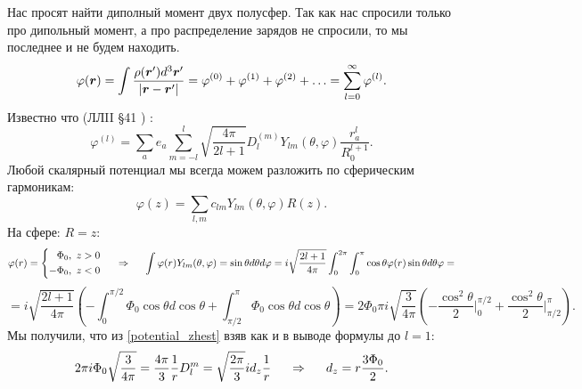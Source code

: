 

Нас просят найти диполный момент двух полусфер.
Так как нас спросили только про дипольный момент, а про распределение зарядов не спросили, то мы последнее и не будем находить.
\begin{equation*}
    \varphi(\mbox{\boldmath $r$}) = \int \frac{\rho(\mbox{\boldmath $r$}') d^3 \mbox{\boldmath $r$}'}{|\mbox{\boldmath $r$} - \mbox{\boldmath $r$}'|}
     = \varphi^{(0)} + \varphi^{(1)} + \varphi^{(2)} + \ldots = \sum_{l=0}^\infty \varphi^{(l)}.
\end{equation*}
Известно что (ЛЛII \S 41 
) :
\begin{equation}
    \varphi^{(l)} = \sum_a e_a\sum_{m = -l}^l \sqrt{\frac{4 \pi}{2 l +1}} D_l^{(m)} Y_{l m} (\theta, \varphi) \frac{r_a^l}{R_0^{l+1}}.
    \label{potential_zhest}
\end{equation}
Любой скалярный потенциал мы всегда можем разложить по сферическим гармоникам:
\begin{equation*}
    \varphi(z) = \sum_{l,m} c_{lm} Y_{lm}(\theta,\varphi) R(z).
\end{equation*}
На сфере: $R=z$:
\begin{equation*}
 \varphi(r) =
    \left\{
    \begin{aligned}
        \Phi_0, \ z>0 \\
        -\Phi_0, \ z<0
    \end{aligned}
    \right.
    \hspace{0.5 cm}
    \Rightarrow
    \hspace{0.5 cm}
    \int \varphi(r) Y_{l m} (\theta, \varphi) = \sin \theta d \theta d\varphi
    =
    i \sqrt{\frac{2 l +1}{4 \pi}} \int_0^{2\pi} \int_0^\pi \cos \theta \varphi(r) \sin \theta d \theta \varphi =
\end{equation*}
\begin{equation*}
    = i \sqrt{\frac{2 l +1}{4 \pi}} \left(
    -\int_0^{\pi/2} \Phi_0 \cos \theta d \cos \theta + \int_{\pi/2}^\pi \Phi_0 \cos \theta d \cos \theta
    \right)
    =
    2 \Phi_0 \pi i \sqrt{\frac{3}{4 \pi}}\left(
    - \frac{\cos ^2 \theta}{2}\bigg|_0^{\pi/2} + \frac{\cos^2 \theta}{2}\bigg|_{\pi/2}^\pi 
    \right).
\end{equation*}
Мы получили, что из \eqref{potential_zhest} взяв как и в выводе формулы до $l=1$:
\begin{equation*}
    2 \pi i \Phi_0 \sqrt{\frac{3}{4\pi}} = \frac{4 \pi}{3} \frac{1}{r} D_l^m = \sqrt{\frac{2 \pi}{3}} i d_z \frac{1}{r}
    \hspace{0.5 cm}
    \Rightarrow
    \hspace{0.5 cm}
    d_z = r \frac{3 \Phi_0}{2}.
\end{equation*}

